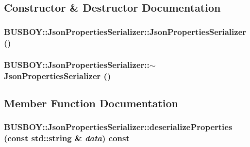 \subsection{Constructor \& Destructor Documentation}
\hypertarget{classBUSBOY_1_1JsonPropertiesSerializer_a3f6db7a2a72dd0a821cef14446e79a0a}{
\subsubsection[{JsonPropertiesSerializer}]{\setlength{\rightskip}{0pt plus 5cm}BUSBOY::JsonPropertiesSerializer::JsonPropertiesSerializer ()}}
\label{classBUSBOY_1_1JsonPropertiesSerializer_a3f6db7a2a72dd0a821cef14446e79a0a}
\hypertarget{classBUSBOY_1_1JsonPropertiesSerializer_a379962712b6499081cde613865424c9c}{
\subsubsection[{$\sim$JsonPropertiesSerializer}]{\setlength{\rightskip}{0pt plus 5cm}BUSBOY::JsonPropertiesSerializer::$\sim$JsonPropertiesSerializer ()}}
\label{classBUSBOY_1_1JsonPropertiesSerializer_a379962712b6499081cde613865424c9c}


\subsection{Member Function Documentation}
\hypertarget{classBUSBOY_1_1JsonPropertiesSerializer_ac42a8bb4281c5a4c079df3be8fd972d2}{
\subsubsection[{deserializeProperties}]{ BUSBOY::JsonPropertiesSerializer::deserializeProperties (const std::string \& {\em data}) const}}
\label{classBUSBOY_1_1JsonPropertiesSerializer_ac42a8bb4281c5a4c079df3be8fd972d2}


